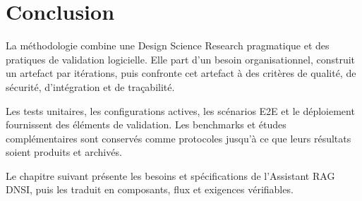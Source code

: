\section{Conclusion}

La méthodologie combine une Design Science Research pragmatique et des pratiques de validation logicielle. Elle part d'un besoin organisationnel, construit un artefact par itérations, puis confronte cet artefact à des critères de qualité, de sécurité, d'intégration et de traçabilité.

Les tests unitaires, les configurations actives, les scénarios E2E et le déploiement fournissent des éléments de validation. Les benchmarks et études complémentaires sont conservés comme protocoles jusqu'à ce que leurs résultats soient produits et archivés.

Le chapitre suivant présente les besoins et spécifications de l'Assistant RAG DNSI, puis les traduit en composants, flux et exigences vérifiables.
